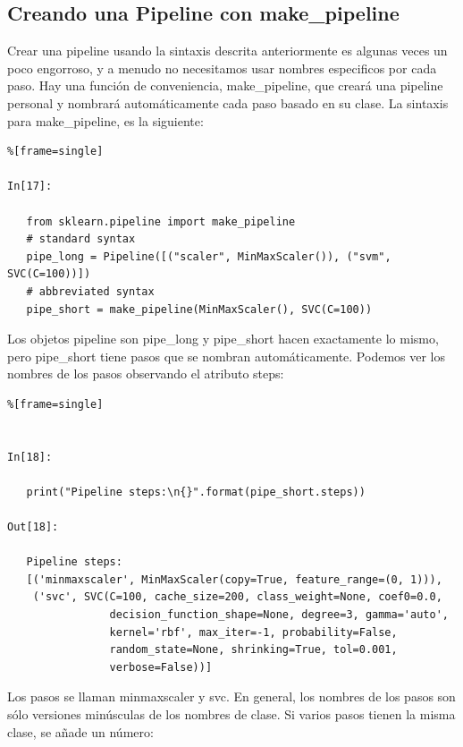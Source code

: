 	\newpage
	
	\subsection{Creando  una  Pipeline   con  {\ttfamily make\_pipeline}}

	
	Crear una pipeline  usando la sintaxis descrita anteriormente es algunas veces un poco engorroso, y a menudo no necesitamos usar nombres especificos por cada paso. Hay una función de conveniencia, {\ttfamily make\_pipeline}, que creará una pipeline personal y nombrará automáticamente cada paso basado en su clase. La sintaxis para {\ttfamily make\_pipeline}, es la siguiente:
	
	
	
	\begin{lstlisting}%[frame=single]
	
In[17]:
	
   from sklearn.pipeline import make_pipeline
   # standard syntax
   pipe_long = Pipeline([("scaler", MinMaxScaler()), ("svm", SVC(C=100))])
   # abbreviated syntax
   pipe_short = make_pipeline(MinMaxScaler(), SVC(C=100))   
   \end{lstlisting}
   
   
   Los objetos pipeline son {\ttfamily pipe\_long}  y  {\ttfamily pipe\_short}  hacen exactamente lo mismo, pero {\ttfamily pipe\_short} tiene pasos que se nombran automáticamente. Podemos ver los nombres de los pasos observando el atributo {\ttfamily steps}:
   
   
   \begin{lstlisting}%[frame=single]
   
   
In[18]:
   
   print("Pipeline steps:\n{}".format(pipe_short.steps))
   
Out[18]:
   
   Pipeline steps:
   [('minmaxscaler', MinMaxScaler(copy=True, feature_range=(0, 1))),
    ('svc', SVC(C=100, cache_size=200, class_weight=None, coef0=0.0,
                decision_function_shape=None, degree=3, gamma='auto',
                kernel='rbf', max_iter=-1, probability=False,
                random_state=None, shrinking=True, tol=0.001,
                verbose=False))]   
   \end{lstlisting}
   
   	
	Los pasos se llaman {\ttfamily minmaxscaler}  y  {\ttfamily svc}. En general, los nombres de los pasos 
	son sólo versiones minúsculas de los nombres de clase. Si varios pasos tienen la misma clase,
	se añade un número:
	
